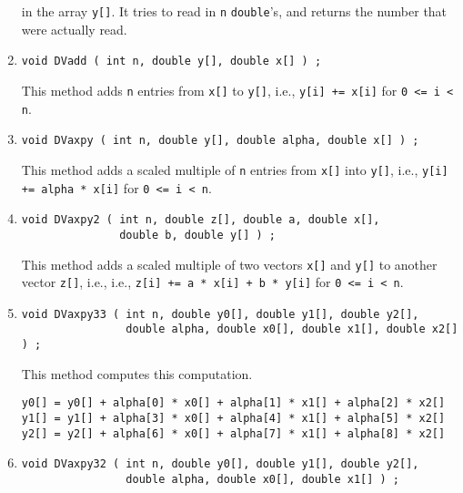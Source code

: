 \begin{enumerate}
in the array {\tt y[]}.
It tries to read in {\tt n} {\tt double}'s, and returns the number
that were actually read.
\item
\begin{verbatim}
void DVadd ( int n, double y[], double x[] ) ;
\end{verbatim}
This method adds {\tt n} entries from {\tt x[]} to {\tt y[]},
i.e.,
{\tt y[i] += x[i]} for {\tt 0 <= i < n}.
\item
\begin{verbatim}
void DVaxpy ( int n, double y[], double alpha, double x[] ) ;
\end{verbatim}
This method adds a scaled multiple of {\tt n} entries from {\tt x[]} 
into {\tt y[]},
i.e.,
{\tt y[i] += alpha * x[i]} for {\tt 0 <= i < n}.
\item
\begin{verbatim}
void DVaxpy2 ( int n, double z[], double a, double x[],
               double b, double y[] ) ;
\end{verbatim}
This method adds a scaled multiple of two vectors {\tt x[]} 
and {\tt y[]} to another vector {\tt z[]}, i.e.,
i.e.,
{\tt z[i] += a * x[i] + b * y[i]} for {\tt 0 <= i < n}.
\item
\begin{verbatim}
void DVaxpy33 ( int n, double y0[], double y1[], double y2[], 
                double alpha, double x0[], double x1[], double x2[] ) ;
\end{verbatim}
This method computes this computation.
\begin{verbatim}
y0[] = y0[] + alpha[0] * x0[] + alpha[1] * x1[] + alpha[2] * x2[]
y1[] = y1[] + alpha[3] * x0[] + alpha[4] * x1[] + alpha[5] * x2[]
y2[] = y2[] + alpha[6] * x0[] + alpha[7] * x1[] + alpha[8] * x2[]
\end{verbatim}
\item
\begin{verbatim}
void DVaxpy32 ( int n, double y0[], double y1[], double y2[], 
                double alpha, double x0[], double x1[] ) ;
\end{verbatim}

\end{enumerate}
